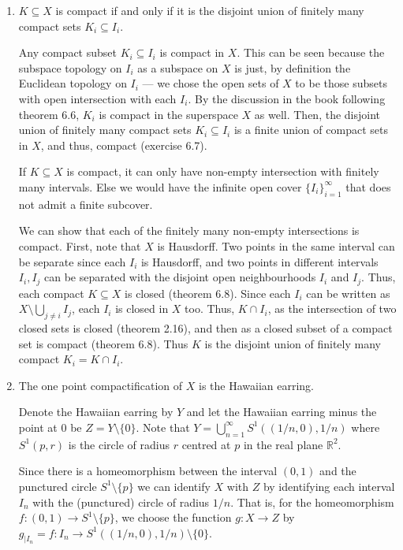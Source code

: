 \documentclass[12 pt, letterpaper]{hmcpset}
\begin{document}
\begin{solution}
	\begin{enumerate}
		\item $K \subseteq X$ is compact if and only if it is the disjoint union of finitely many compact sets $K_{i} \subseteq I_{i}$.

			Any compact subset $K_{i} \subseteq I_{i}$ is compact in $X$. This can be seen because the subspace topology on $I_{i}$ as a subspace on $X$ is just, by definition the Euclidean topology on $I_{i}$ --- we chose the open sets of $X$ to be those subsets with open intersection with each $I_{i}$. By the discussion in the book following theorem 6.6, $K_{i}$ is compact in the superspace $X$ as well. Then, the disjoint union of finitely many compact sets $K_{i} \subseteq I_{i}$ is a finite union of compact sets in $X$, and thus, compact (exercise 6.7).

			If $K \subseteq X$ is compact, it can only have non-empty intersection with finitely many intervals. Else we would have the infinite open cover $\{ I_{i} \}_{i = 1}^{\infty}$ that does not admit a finite subcover. 

			We can show that each of the finitely many non-empty intersections is compact. First, note that $X$ is Hausdorff. Two points in the same interval can be separate since each $I_{i}$ is Hausdorff, and two points in different intervals $I_{i}, I_{j}$ can be separated with the disjoint open neighbourhoods $I_{i}$ and $I_{j}$. Thus, each compact $K \subseteq X$ is closed (theorem 6.8). Since each $I_{i}$ can be written as $X \setminus \bigcup_{j \neq i} I_{j}$, each $I_{i}$ is closed in $X$ too. Thus, $K \cap I_{i}$, as the intersection of two closed sets is closed (theorem 2.16), and then as a closed subset of a compact set is compact (theorem 6.8). Thus $K$ is the disjoint union of finitely many compact $K_{i} = K \cap I_{i}$.

		\item The one point compactification of $X$ is the Hawaiian earring.

			Denote the Hawaiian earring by $Y$ and let the Hawaiian earring minus the point at $0$ be $Z = Y \setminus \{ 0 \}$. Note that $Y = \bigcup_{n = 1}^{\infty} S^{1}((1/n, 0), 1/n)$ where $S^{1}(p, r)$ is the circle of radius $r$ centred at $p$ in the real plane $\mathbb{R}^{2}$.

			Since there is a homeomorphism between the interval $(0, 1)$ and the punctured circle $S^{1} \setminus \{ p \}$ we can identify $X$ with  $Z$ by identifying each interval $I_{n}$ with the (punctured) circle of radius $1 / n$. That is, for the homeomorphism $f : (0, 1) \to S^{1} \setminus \{ p \}$, we choose the function $g : X \to Z$ by $g_{\mid I_{n}} = f : I_{n} \to S^{1}((1/n, 0), 1/n) \setminus \{ 0 \}$.


\end{enumerate}
\end{solution}
\end{document}
